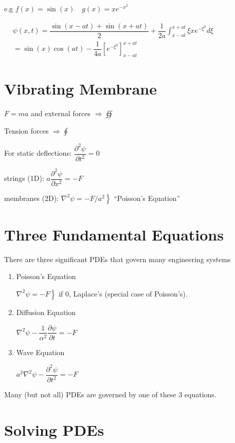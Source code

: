 \documentclass{report}
\begin{document}
e.g $f(x)=\sin(x)\quad g(x)=xe^{-x^2}$

$\begin{aligned}
    & \psi(x, t)=\dfrac{\sin (x-a t)+\sin (x+a t)}{2}+\dfrac{1}{2 a} \displaystyle\int_{x-a t}^{x+a t} \xi x e^{-\xi^{2}} d \xi\\
    & =\sin (x) \cos (a t)-\dfrac{1}{4 a}\left[e^{-\xi^{2}}\right]_{x-a t}^{x+a t}
\end{aligned}$


\section{Vibrating Membrane}


$F=m a$ and external forces $\Rightarrow \oiint$

Tension forces $\Rightarrow \oint$

For static deflections: $\dfrac{\partial^{2} \psi}{\partial t^{2}}=0$

strings (1D): $a \dfrac{\partial^{2} \psi}{\partial x^{2}}=-F$

membranes (2D): $\left.\nabla^{2} \psi=-F / a^{2}\right\}$ ``Poisson's Equation''

\section{Three Fundamental Equations}
There are three significant PDEs that govern many engineering systems
\begin{enumerate}
  \item Poisson's Equation

  $\left.\nabla^{2} \psi=-F\right\}$ if 0, Laplace's (special case of Poisson's).
  
  \item Diffusion Equation

  $\nabla^{2} \psi-\dfrac{1}{\alpha^{2}} \dfrac{\partial \psi}{\partial t}=-F$

  \item Wave Equation

  $a^{2} \nabla^{2} \psi-\dfrac{\partial^{2} \psi}{\partial t^{2}}=-F$
\end{enumerate}


Many (but not all) PDEs are governed by one of these 3 equations.

\section{Solving PDEs}
\end{document}
